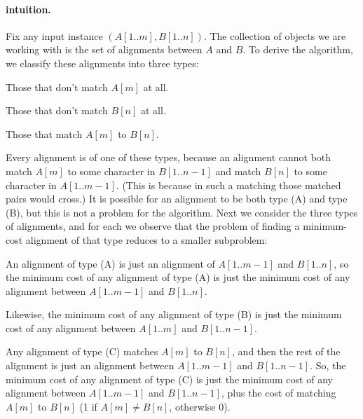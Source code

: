 \paragraph{intuition.}
Fix any input instance $(A[1..m], B[1..n])$.
The collection of objects we are working with is the set of alignments between $A$ and $B$.
To derive the algorithm, we classify these alignments into three types:
\begin{mylist}
\item[(A)] Those that don't match $A[m]$ at all.
\item[(B)] Those that  don't match $B[n]$ at all. 
\item[(C)] Those that match $A[m]$ to $B[n]$.
\end{mylist}
Every alignment is of one of these types, because an alignment cannot both match $A[m]$
to some character in $B[1..n-1]$ and match $B[n]$ to some character in $A[1..m-1]$.
(This is because in such a matching those matched pairs would cross.)
It is possible for an alignment to be both type (A) and type (B),
but this is not a problem for the algorithm.
Next we consider the three types of alignments,
and for each we observe that the problem of finding a minimum-cost alignment of that type
reduces to a smaller subproblem:
\begin{mylist}
\item[(A)] An alignment of type (A) is just an alignment of $A[1..m-1]$ and $B[1..n]$,
  so the minimum cost of any alignment of type (A)
  is just the minimum cost of any alignment between $A[1..m-1]$ and $B[1..n]$.

\item[(B)] Likewise, the minimum cost of any alignment of type (B)
  is just the minimum cost of any alignment between $A[1..m]$ and $B[1..n-1]$.

\item[(C)] Any alignment of type (C) matches $A[m]$ to $B[n]$, and then the rest of the alignment
  is just an alignment between $A[1..m-1]$ and $B[1..n-1]$.
  So, the minimum cost of any alignment of type (C)
  is just the minimum cost of any alignment between  $A[1..m-1]$ and $B[1..n-1]$,
  plus the cost of matching $A[m]$ to $B[n]$
  (1 if $A[m] \ne B[n]$, otherwise 0).
\end{mylist}

